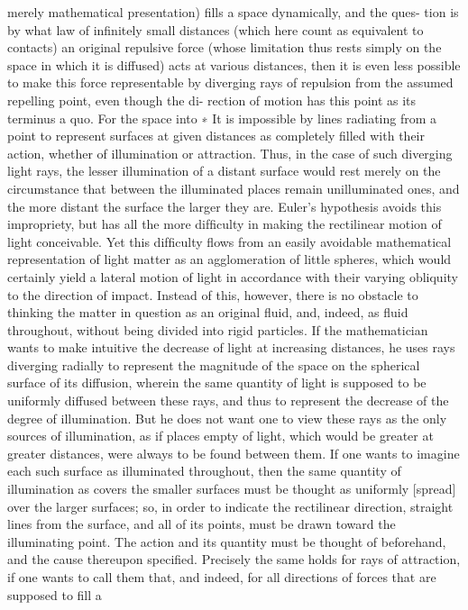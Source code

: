 merely mathematical presentation) ﬁlls a space dynamically, and the ques-
tion is by what law of inﬁnitely small distances (which here count as
equivalent to contacts) an original repulsive force (whose limitation thus
rests simply on the space in which it is diffused) acts at various distances,
then it is even less possible to make this force representable by diverging
rays of repulsion from the assumed repelling point, even though the di-
rection of motion has this point as its terminus a quo. For the space into
∗
It is impossible by lines radiating from a point to represent surfaces at given
distances as completely ﬁlled with their action, whether of illumination or
attraction. Thus, in the case of such diverging light rays, the lesser illumination
of a distant surface would rest merely on the circumstance that between the
illuminated places remain unilluminated ones, and the more distant the surface
the larger they are. Euler’s hypothesis avoids this impropriety, but has all the
more difﬁculty in making the rectilinear motion of light conceivable. Yet this
difﬁculty ﬂows from an easily avoidable mathematical representation of light
matter as an agglomeration of little spheres, which would certainly yield a lateral
motion of light in accordance with their varying obliquity to the direction of
impact. Instead of this, however, there is no obstacle to thinking the matter in
question as an original ﬂuid, and, indeed, as ﬂuid throughout, without being
divided into rigid particles. If the mathematician wants to make intuitive the
decrease of light at increasing distances, he uses rays diverging radially to
represent the magnitude of the space on the spherical surface of its diffusion,
wherein the same quantity of light is supposed to be uniformly diffused between
these rays, and thus to represent the decrease of the degree of illumination.
But he does not want one to view these rays as the only sources of illumination,
as if places empty of light, which would be greater at greater distances, were
always to be found between them. If one wants to imagine each such surface
as illuminated throughout, then the same quantity of illumination as covers
the smaller surfaces must be thought as uniformly [spread] over the larger
surfaces; so, in order to indicate the rectilinear direction, straight lines from the
surface, and all of its points, must be drawn toward the illuminating point. The
action and its quantity must be thought of beforehand, and the cause thereupon
speciﬁed. Precisely the same holds for rays of attraction, if one wants to call
them that, and indeed, for all directions of forces that are supposed to ﬁll a
